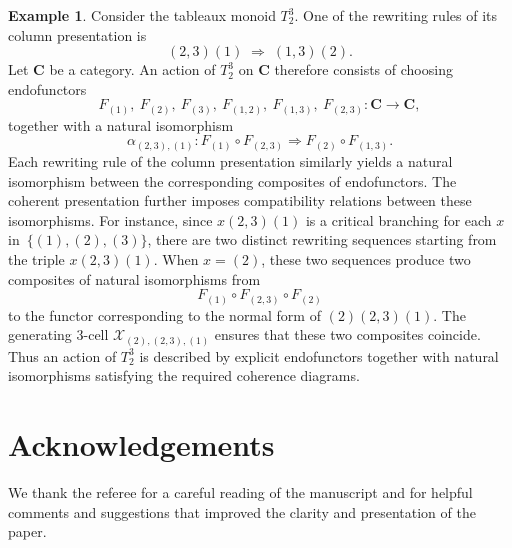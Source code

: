 \documentclass[a4paper, twoside, 11pt, english]{article}
\theoremstyle{plain}
\theoremstyle{definition}
\newtheorem{example}[subsubsection]{Example}
\newcommand{\dfl}{\Rightarrow}
\def\Xr{\mathcal{X}}
\begin{document}
\begin{example}
Consider the tableaux monoid $T_2^3$.
One of the rewriting rules of its column presentation is
\[
(2,3)(1)\;\dfl\;(1,3)(2).
\]
Let $\mathbf C$ be a category.
An action of $T_2^3$ on $\mathbf C$ therefore consists of choosing
endofunctors
\[
F_{(1)},\ F_{(2)},\ F_{(3)},\
F_{(1,2)},\ F_{(1,3)},\ F_{(2,3)} :
\mathbf C \to \mathbf C,
\]
together with a natural isomorphism
\[
\alpha_{(2,3),(1)}:
F_{(1)}\circ F_{(2,3)}
\Rightarrow
F_{(2)}\circ F_{(1,3)}.
\]
Each rewriting rule of the column presentation similarly yields a
natural isomorphism between the corresponding composites of
endofunctors.
The coherent presentation further imposes compatibility relations
between these isomorphisms.
For instance, since $x(2,3)(1)$ is a critical branching for each
$x$ in~$\{(1),(2),(3)\}$, there are two distinct rewriting sequences
starting from the triple $x(2,3)(1)$.
When $x=(2)$, these two sequences produce two composites of natural
isomorphisms from
\[
F_{(1)}\circ F_{(2,3)}\circ F_{(2)}
\]
to the functor corresponding to the normal form of $(2)(2,3)(1)$.
The generating $3$-cell $\Xr_{(2),(2,3),(1)}$ ensures that these two
composites coincide.
Thus an action of $T_2^3$ is described by explicit endofunctors together
with natural isomorphisms satisfying the required coherence diagrams.
\end{example}


\section*{Acknowledgements}
We thank the referee for a careful reading of the manuscript
and for helpful comments and suggestions that improved
the clarity and presentation of the paper.
\end{document}

